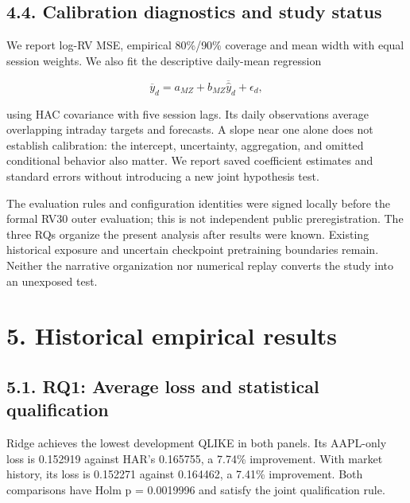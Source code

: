 \subsection{4.4. Calibration diagnostics and study
status}\label{calibration-diagnostics-and-study-status}

We report log-RV MSE, empirical 80\%/90\% coverage and mean width with
equal session weights. We also fit the descriptive daily-mean regression

\[
\overline y_d=a_{MZ}+b_{MZ}\overline{\widehat y}_d+\epsilon_d,
\]

using HAC covariance with five session lags. Its daily observations
average overlapping intraday targets and forecasts. A slope near one
alone does not establish calibration: the intercept, uncertainty,
aggregation, and omitted conditional behavior also matter. We report
saved coefficient estimates and standard errors without introducing a
new joint hypothesis test.

The evaluation rules and configuration identities were signed locally
before the formal RV30 outer evaluation; this is not independent public
preregistration. The three RQs organize the present analysis after
results were known. Existing historical exposure and uncertain
checkpoint pretraining boundaries remain. Neither the narrative
organization nor numerical replay converts the study into an unexposed
test.

\section{5. Historical empirical
results}\label{historical-empirical-results}

\subsection{5.1. RQ1: Average loss and statistical
qualification}\label{rq1-average-loss-and-statistical-qualification}

Ridge achieves the lowest development QLIKE in both panels. Its
AAPL-only loss is 0.152919 against HAR's 0.165755, a 7.74\% improvement.
With market history, its loss is 0.152271 against 0.164462, a 7.41\%
improvement. Both comparisons have Holm p = 0.0019996 and satisfy the
joint qualification rule.

